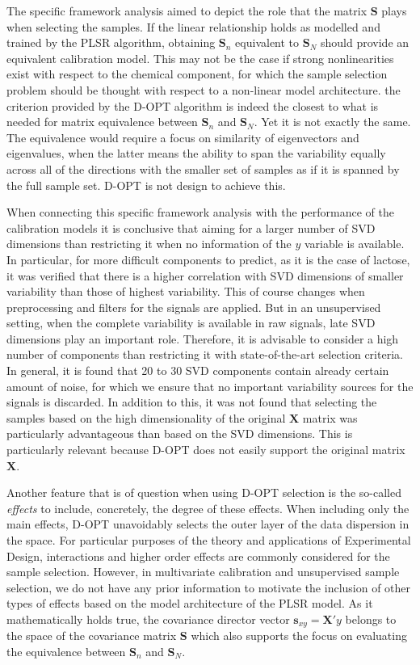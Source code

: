\documentclass[journal=ancham,manuscript=article]{achemso}
\begin{document}
The specific framework analysis aimed to depict the role that the matrix $\mathbf{S}$ plays when selecting the samples. If the linear relationship holds as modelled and trained by the PLSR algorithm, obtaining $\mathbf{S}_n$ equivalent to $\mathbf{S}_N$ should provide an equivalent calibration model. This may not be the case if strong nonlinearities exist with respect to the chemical component, for which the sample selection problem should be thought with respect to a non-linear model architecture. the criterion provided by the D-OPT algorithm is indeed the closest to what is needed for matrix equivalence between $\mathbf{S}_n$ and $\mathbf{S}_N$. Yet it is not exactly the same. The equivalence would require a focus on similarity of eigenvectors and eigenvalues, when the latter means the ability to span the variability equally across all of the directions with the smaller set of samples as if it is spanned by the full sample set. D-OPT is not design to achieve this.

When connecting this specific framework analysis with the performance of the calibration models it is conclusive that aiming for a larger number of SVD dimensions than restricting it when no information of the $y$ variable is available. In particular, for more difficult components to predict, as it is the case of lactose, it was verified that there is a higher correlation with SVD dimensions of smaller variability than those of highest variability. This of course changes when preprocessing and filters for the signals are applied. But in an unsupervised setting, when the complete variability is available in raw signals, late SVD dimensions play an important role. Therefore, it is advisable to consider a high number of components than restricting it with state-of-the-art selection criteria. In general, it is found that 20 to 30 SVD components contain already certain amount of noise, for which we ensure that no important variability sources for the signals is discarded. In addition to this, it was not found that selecting the samples based on the high dimensionality of the original $\mathbf{X}$ matrix was particularly advantageous than based on the SVD dimensions. This is particularly relevant because D-OPT does not easily support the original matrix $\mathbf{X}$.

Another feature that is of question when using D-OPT selection is the so-called \emph{effects} to include, concretely, the degree of these effects. When including only the main effects, D-OPT unavoidably selects the outer layer of the data dispersion in the space. For particular purposes of the theory and applications of Experimental Design, interactions and higher order effects are commonly considered for the sample selection. However, in multivariate calibration and unsupervised sample selection, we do not have any prior information to motivate the inclusion of other types of effects based on the model architecture of the PLSR model. As it mathematically holds true, the covariance director vector $\mathbf{s}_{xy} = \mathbf{X}'y$ belongs to the space of the covariance matrix $\mathbf{S}$ which also supports the focus on evaluating the equivalence between $\mathbf{S}_n$ and $\mathbf{S}_N$. 
\end{document}
